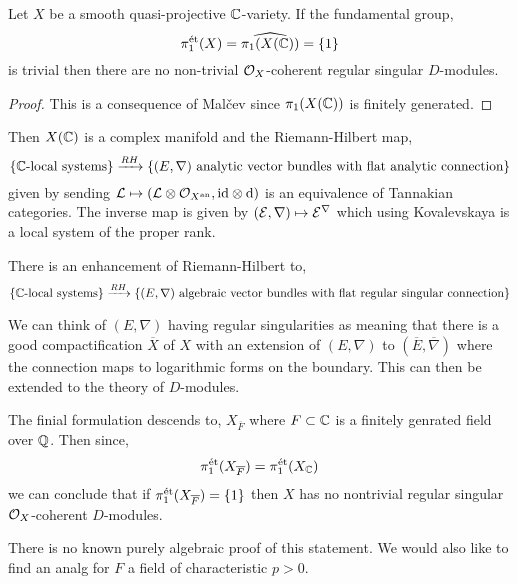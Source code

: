 \documentclass[12pt]{article}
\begin{document}
\begin{theorem}[Grothendieck]
Let $X$ be a smooth quasi-projective $\mathbb{C}$-variety. If the \etale fundamental group,
\[ \pi_1^{\text{\'{e}t}}(X) = \widehat{\pi_1(X(\mathbb{C}))} = \{ 1 \} \]
is trivial then there are no non-trivial $\mathcal{O}_{X}$-coherent regular singular $D$-modules.
\end{theorem}

\begin{proof}
This is a consequence of Mal\v{c}ev since $\pi_1(X(\mathbb{C}))$ is finitely generated. 
\end{proof}

\begin{rmk}
Then $X(\mathbb{C})$ is a complex manifold and the Riemann-Hilbert map,
\[ \{ \mathbb{C}\text{-local systems} \} \xrightarrow{RH} \{ (E, \nabla) \text{ analytic vector bundles with flat analytic connection} \} \]
given by sending $\mathcal{L} \mapsto (\mathcal{L} \otimes \mathcal{O}_{X^{\mathrm{an}}}, \mathrm{id} \otimes \mathrm{d})$ is an equivalence of Tannakian categories. The inverse map is given by $(\mathcal{E}, \nabla) \mapsto \mathcal{E}^{\nabla}$ which using Kovalevskaya is a local system of the proper rank.
\end{rmk}

\begin{theorem}[Deligne]
There is an enhancement of Riemann-Hilbert to,
\[ \{ \mathbb{C}\text{-local systems} \} \xrightarrow{RH} \{ (E, \nabla) \text{ algebraic vector bundles with flat regular singular connection} \} \]
\end{theorem}

\begin{rmk}
We can think of $(E, \nabla)$ having regular singularities as meaning that there is a good compactification $\overline{X}$ of $X$ with an extension of $(E, \nabla)$ to $(\overline{E}, \overline{\nabla})$ where the connection maps to logarithmic forms on the boundary. This can then be extended to the theory of $D$-modules. 
\end{rmk}

The finial formulation descends to,
$X_{\overline{F}}$ where $F \subset \mathbb{C}$ is a finitely genrated field over $\mathbb{Q}$. Then since,
\[ \pi_1^{\text{\'{e}t}}(X_{\overline{F}}) = \pi_1^{\text{\'{e}t}}(X_{\mathbb{C}}) \]
we can conclude that if $\pi_1^{\text{\'{e}t}}(X_{\overline{F}}) = \{ 1 \}$ then $X$ has no nontrivial regular singular $\mathcal{O}_{X}$-coherent $D$-modules.

\begin{rmk}
There is no known purely algebraic proof of this statement. We would also like to find an analg for $F$ a field of characteristic $p > 0$. 
\end{rmk}
\end{document}
